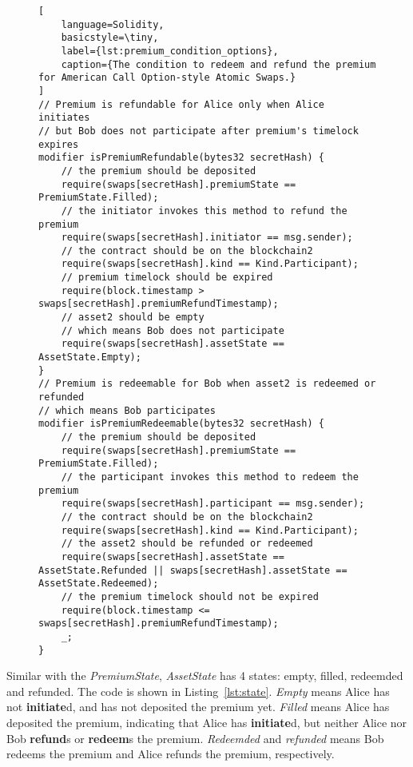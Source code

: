 \begin{figure}[htb]
\begin{lstlisting}[
    language=Solidity, 
    basicstyle=\tiny,
    label={lst:premium_condition_options},
    caption={The condition to redeem and refund the premium for American Call Option-style Atomic Swaps.}
]
// Premium is refundable for Alice only when Alice initiates
// but Bob does not participate after premium's timelock expires
modifier isPremiumRefundable(bytes32 secretHash) {
    // the premium should be deposited
    require(swaps[secretHash].premiumState == PremiumState.Filled);
    // the initiator invokes this method to refund the premium
    require(swaps[secretHash].initiator == msg.sender);
    // the contract should be on the blockchain2
    require(swaps[secretHash].kind == Kind.Participant);
    // premium timelock should be expired
    require(block.timestamp > swaps[secretHash].premiumRefundTimestamp);
    // asset2 should be empty
    // which means Bob does not participate
    require(swaps[secretHash].assetState == AssetState.Empty);
}
// Premium is redeemable for Bob when asset2 is redeemed or refunded
// which means Bob participates
modifier isPremiumRedeemable(bytes32 secretHash) {
    // the premium should be deposited
    require(swaps[secretHash].premiumState == PremiumState.Filled);
    // the participant invokes this method to redeem the premium
    require(swaps[secretHash].participant == msg.sender);
    // the contract should be on the blockchain2
    require(swaps[secretHash].kind == Kind.Participant);
    // the asset2 should be refunded or redeemed
    require(swaps[secretHash].assetState == AssetState.Refunded || swaps[secretHash].assetState == AssetState.Redeemed);
    // the premium timelock should not be expired
    require(block.timestamp <= swaps[secretHash].premiumRefundTimestamp);
    _;
}
\end{lstlisting}
\end{figure}

Similar with the \textit{PremiumState}, \textit{AssetState} has 4 states: empty, filled, redeemded and refunded.
The code is shown in Listing~\ref{lst:state}.
\textit{Empty} means Alice has not \textbf{initiate}d, and has not deposited the premium yet.
\textit{Filled} means Alice has deposited the premium, indicating that Alice has \textbf{initiate}d, but neither Alice nor Bob \textbf{refund}s or \textbf{redeem}s the premium.
\textit{Redeemded} and \textit{refunded} means Bob redeems the premium and Alice refunds the premium, respectively.

